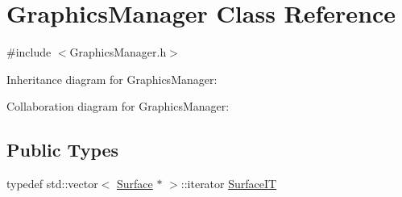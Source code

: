 \hypertarget{classGraphicsManager}{}\section{Graphics\+Manager Class Reference}
\label{classGraphicsManager}


{\ttfamily \#include $<$Graphics\+Manager.\+h$>$}



Inheritance diagram for Graphics\+Manager\+:


Collaboration diagram for Graphics\+Manager\+:
\subsection*{Public Types}
\begin{DoxyCompactItemize}
\item 
typedef std\+::vector$<$ \hyperlink{classSurface}{Surface} $\ast$ $>$\+::iterator \hyperlink{classGraphicsManager_a066a5ed1364f54d5d52cfec0b8552969}{Surface\+IT}
\end{DoxyCompactItemize}
